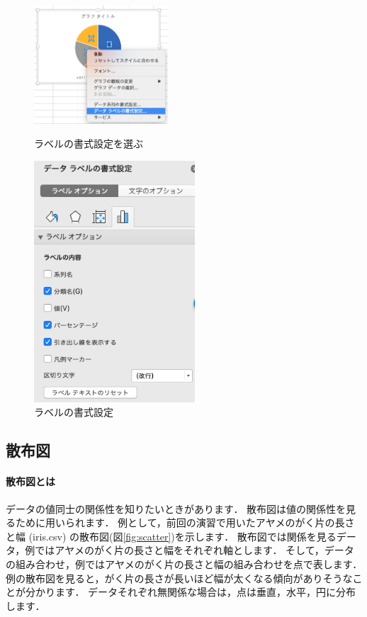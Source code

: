 \begin{figure}[tb]
    \begin{minipage}{0.5\hsize}
        \centering
        \includegraphics[width=5cm]{chap2/piechart_select_label_option.png}
        \caption{ラベルの書式設定を選ぶ}
        \label{fig:piechart_select_label_option}
    \end{minipage}
    \begin{minipage}{0.5\hsize}
        \centering
        \includegraphics[width=6cm]{chap2/piechart_label_option.png}
        \caption{ラベルの書式設定}
        \label{fig:piechart_label_option}
    \end{minipage}
\end{figure}


\subsection{散布図}

\paragraph{散布図とは}

データの値同士の関係性を知りたいときがあります．
散布図は値の関係性を見るために用いられます．
例として，前回の演習で用いたアヤメのがく片の長さと幅 (iris.csv) の散布図(図\ref{fig:scatter})を示します．
散布図では関係を見るデータ，例ではアヤメのがく片の長さと幅をそれぞれ軸とします．
そして，データの組み合わせ，例ではアヤメのがく片の長さと幅の組み合わせを点で表します．
例の散布図を見ると，がく片の長さが長いほど幅が太くなる傾向がありそうなことが分かります．
データそれぞれ無関係な場合は，点は垂直，水平，円に分布します．

